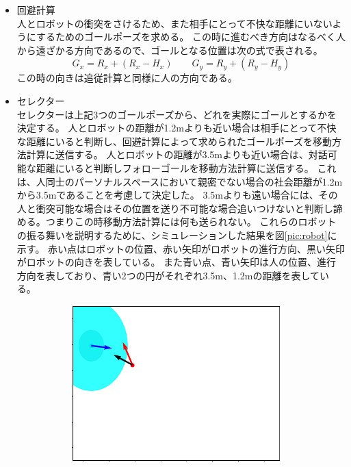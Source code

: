 \documentclass{kuisthesis}
\begin{document}
\begin{itemize}
  \item 回避計算 \\
  人とロボットの衝突をさけるため、また相手にとって不快な距離にいないようにするためのゴールポーズを求める。
  この時に進むべき方向はなるべく人から遠ざかる方向であるので、ゴールとなる位置は次の式で表される。
  \begin{equation}
    G_x = R_x + (R_x - H_x) \qquad G_y = R_y + (R_y - H_y)
  \end{equation}
  この時の向きは追従計算と同様に人の方向である。
  \item セレクター \\
  セレクターは上記3つのゴールポーズから、どれを実際にゴールとするかを決定する。
  人とロボットの距離が1.2mよりも近い場合は相手にとって不快な距離にいると判断し、回避計算によって求められたゴールポーズを移動方法計算に送信する。
  人とロボットの距離が3.5mよりも近い場合は、対話可能な距離にいると判断しフォローゴールを移動方法計算に送信する。
  これは、人同士のパーソナルスペースにおいて親密でない場合の社会距離が1.2mから3.5mであることを考慮して決定した。
  3.5mよりも遠い場合には、その人と衝突可能な場合はその位置を送り不可能な場合追いつけないと判断し諦める。つまりこの時移動方法計算には何も送られない。
  これらのロボットの振る舞いを説明するために、シミュレーションした結果を図\ref{pic:robot}に示す。
  赤い点はロボットの位置、赤い矢印がロボットの進行方向、黒い矢印がロボットの向きを表している。
  また青い点、青い矢印は人の位置、進行方向を表しており、青い2つの円がそれぞれ3.5m、1.2mの距離を表している。
\begin{figure}[H]
  \begin{subfigure}{0.25\textwidth}
    \includegraphics[width=0.95\textwidth]{img/simulation1.png}

\end{subfigure}
\end{figure}
\end{itemize}
\end{document}
